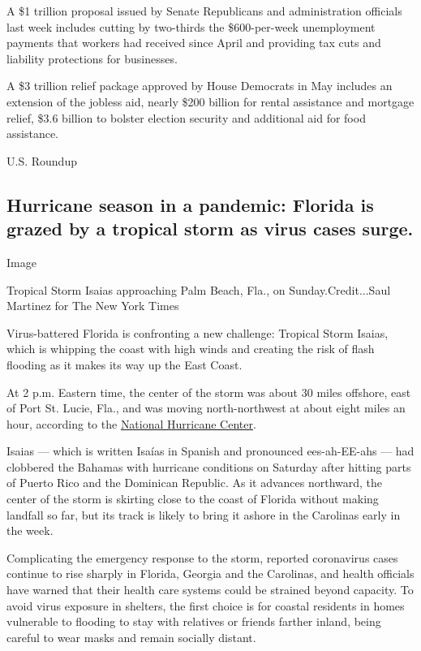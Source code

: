 A \$1 trillion proposal issued by Senate Republicans and administration
officials last week includes cutting by two-thirds the \$600-per-week
unemployment payments that workers had received since April and
providing tax cuts and liability protections for businesses.

A \$3 trillion relief package approved by House Democrats in May
includes an extension of the jobless aid, nearly \$200 billion for
rental assistance and mortgage relief, \$3.6 billion to bolster election
security and additional aid for food assistance.

U.S. Roundup

\hypertarget{hurricane-season-in-a-pandemic-florida-is-grazed-by-a-tropical-storm-as-virus-cases-surge}{%
\subsection{Hurricane season in a pandemic: Florida is grazed by a
tropical storm as virus cases
surge.}\label{hurricane-season-in-a-pandemic-florida-is-grazed-by-a-tropical-storm-as-virus-cases-surge}}

Image

Tropical Storm Isaias approaching Palm Beach, Fla., on
Sunday.Credit...Saul Martinez for The New York Times

Virus-battered Florida is confronting a new challenge: Tropical Storm
Isaias, which is whipping the coast with high winds and creating the
risk of flash flooding as it makes its way up the East Coast.

At 2 p.m. Eastern time, the center of the storm was about 30 miles
offshore, east of Port St. Lucie, Fla., and was moving north-northwest
at about eight miles an hour, according to the
\href{https://www.nhc.noaa.gov/text/refresh/MIATCPAT4+shtml/020856.shtml?}{National
Hurricane Center}.

Isaias --- which is written Isaías in Spanish and pronounced
ees-ah-EE-ahs --- had clobbered the Bahamas with hurricane conditions on
Saturday after hitting parts of Puerto Rico and the Dominican Republic.
As it advances northward, the center of the storm is skirting close to
the coast of Florida without making landfall so far, but its track is
likely to bring it ashore in the Carolinas early in the week.

Complicating the emergency response to the storm, reported coronavirus
cases continue to rise sharply in Florida, Georgia and the Carolinas,
and health officials have warned that their health care systems could be
strained beyond capacity. To avoid virus exposure in shelters, the first
choice is for coastal residents in homes vulnerable to flooding to stay
with relatives or friends farther inland, being careful to wear masks
and remain socially distant.

